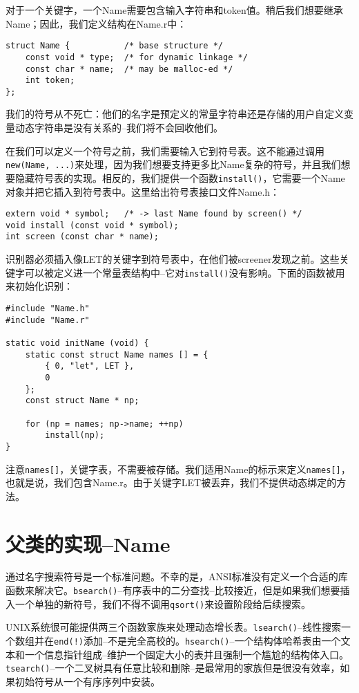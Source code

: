 对于一个关键字，一个Name需要包含输入字符串和token值。稍后我们想要继承Name；因此，我们定义结构在Name.r中：

\begin{lstlisting}
struct Name {			/* base structure */
	const void * type;	/* for dynamic linkage */
	const char * name;	/* may be malloc-ed */
	int token;
};
\end{lstlisting}

我们的符号从不死亡：他们的名字是预定义的常量字符串还是存储的用户自定义变量动态字符串是没有关系的--我们将不会回收他们。

在我们可以定义一个符号之前，我们需要输入它到符号表。这不能通过调用\verb|new(Name, ...)|来处理，因为我们想要支持更多比Name复杂的符号，并且我们想要隐藏符号表的实现。相反的，我们提供一个函数\verb|install()|，它需要一个Name对象并把它插入到符号表中。这里给出符号表接口文件Name.h：

\begin{lstlisting}
extern void * symbol;	/* -> last Name found by screen() */
void install (const void * symbol);
int screen (const char * name);
\end{lstlisting}

识别器必须插入像LET的关键字到符号表中，在他们被screener发现之前。这些关键字可以被定义进一个常量表结构中--它对\verb|install()|没有影响。下面的函数被用来初始化识别：

\begin{lstlisting}
#include "Name.h"
#include "Name.r"

static void initName (void) {
	static const struct Name names [] = {
		{ 0, "let", LET },
		0
	};
	const struct Name * np;
	
	for (np = names; np->name; ++np)
		install(np);
}
\end{lstlisting}

注意\verb|names[]|，关键字表，不需要被存储。我们适用Name的标示来定义\verb|names[]|，也就是说，我们包含Name.r。由于关键字LET被丢弃，我们不提供动态绑定的方法。

\section{父类的实现--Name}

通过名字搜索符号是一个标准问题。不幸的是，ANSI标准没有定义一个合适的库函数来解决它。\verb|bsearch()|--有序表中的二分查找--比较接近，但是如果我们想要插入一个单独的新符号，我们不得不调用\verb|qsort()|来设置阶段给后续搜索。

UNIX系统很可能提供两三个函数家族来处理动态增长表。\verb|lsearch()|--线性搜索一个数组并在\verb|end(!)|添加--不是完全高校的。\verb|hsearch()|--一个结构体哈希表由一个文本和一个信息指针组成--维护一个固定大小的表并且强制一个尴尬的结构体入口。\verb|tsearch()|--一个二叉树具有任意比较和删除--是最常用的家族但是很没有效率，如果初始符号从一个有序序列中安装。

